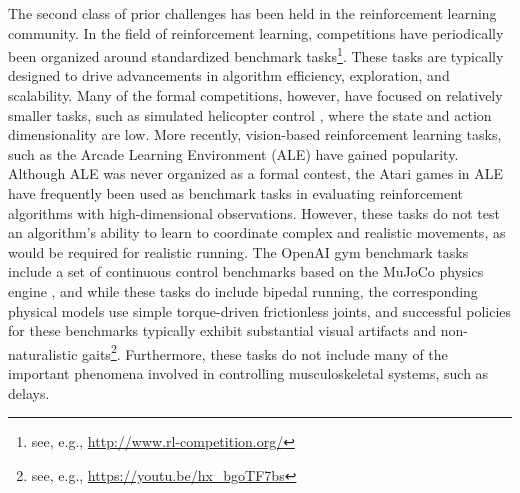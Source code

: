\documentclass[graybox]{svmult}
\begin{document}
The second class of prior challenges has been held in the reinforcement learning community. In the field of reinforcement learning, competitions have periodically been organized around standardized benchmark tasks\footnote{see, e.g., \url{http://www.rl-competition.org/}}. These tasks are typically designed to drive advancements in algorithm efficiency, exploration, and scalability. Many of the formal competitions, however, have focused on relatively smaller tasks, such as simulated helicopter control \cite{dimitrakakis2014reinforcement}, where the state and action dimensionality are low. More recently, vision-based reinforcement learning tasks, such as the Arcade Learning Environment (ALE) \cite{bellemare13arcade} have gained popularity. Although ALE was never organized as a formal contest, the Atari games in ALE have frequently been used as benchmark tasks in evaluating reinforcement algorithms with high-dimensional observations. However, these tasks do not test an algorithm's ability to learn to coordinate complex and realistic movements, as would be required for realistic running. The OpenAI gym benchmark tasks \cite{brockman2016openai} include a set of continuous control benchmarks based on the MuJoCo physics engine \cite{todorov2012mujoco}, and while these tasks do include bipedal running, the corresponding physical models use simple torque-driven frictionless joints, and successful policies for these benchmarks typically exhibit substantial visual artifacts and non-naturalistic gaits\footnote{see, e.g., \url{https://youtu.be/hx_bgoTF7bs}}. Furthermore, these tasks do not include many of the important phenomena involved in controlling musculoskeletal systems, such as delays.
\end{document}
